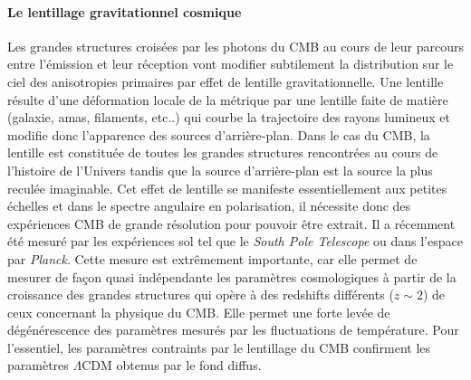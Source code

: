 \paragraph{Le lentillage gravitationnel cosmique}
Les grandes structures croisées par les photons du CMB au cours de leur parcours entre l'émission et leur réception vont modifier subtilement la distribution sur le ciel des anisotropies primaires par effet de lentille gravitationnelle. Une lentille résulte d'une déformation locale de la métrique par une lentille faite de matière (galaxie, amas, filaments, etc..) qui courbe la trajectoire des rayons lumineux et modifie donc l'apparence des sources d'arrière-plan. Dans le cas du CMB, la lentille est constituée de toutes les grandes structures rencontrées au cours de l'histoire de l'Univers tandis que la source d'arrière-plan est la source la plus reculée imaginable. Cet effet de lentille se manifeste essentiellement aux petites échelles et dans le spectre angulaire en polarisation, il nécessite donc des expériences CMB de grande résolution pour pouvoir être extrait. Il a récemment été mesuré par les expériences sol tel que le \textit{South Pole Telescope} ou dans l'espace par \textit{Planck}. Cette mesure est extrêmement importante, car elle permet de mesurer de façon quasi indépendante les paramètres cosmologiques à partir de la croissance des grandes structures qui opère à des redshifts différents ($z\sim 2$) de ceux concernant la physique du CMB. Elle permet une forte levée de dégénérescence des paramètres mesurés par les fluctuations de température. Pour l'essentiel, les paramètres contraints par le lentillage du CMB confirment les paramètres $\Lambda$CDM obtenus par le fond diffus.